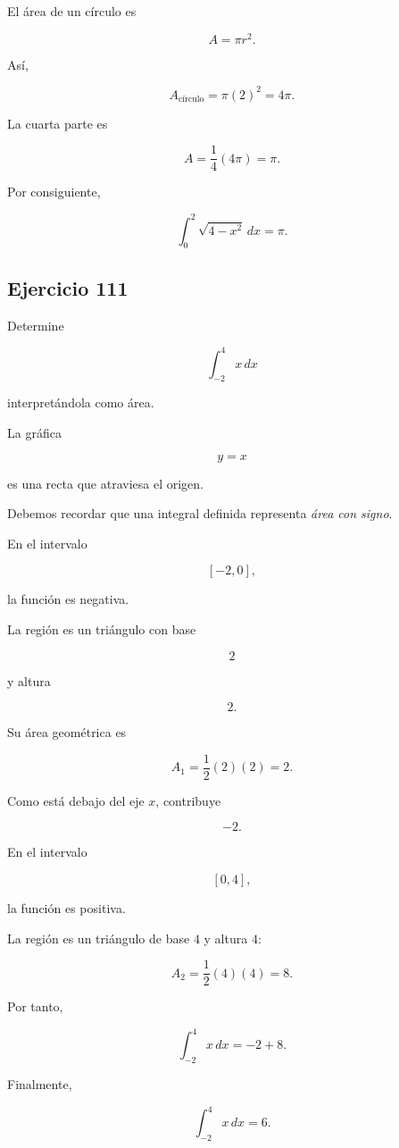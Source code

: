 \documentclass[12pt]{article}
\begin{document}
El área de un círculo es

\[
A=\pi r^2.
\]

Así,

\[
A_{\text{círculo}}
=
\pi(2)^2
=
4\pi.
\]

La cuarta parte es

\[
A=\frac14(4\pi)=\pi.
\]

Por consiguiente,

\[
\boxed{
\int_{0}^{2}\sqrt{4-x^2}\,dx=\pi
}.
\]

\subsection*{Ejercicio 111}

Determine

\[
\int_{-2}^{4}x\,dx
\]

interpretándola como área.

La gráfica

\[
y=x
\]

es una recta que atraviesa el origen.

Debemos recordar que una integral definida representa
\emph{área con signo}.

En el intervalo

\[
[-2,0],
\]

la función es negativa.

La región es un triángulo con base

\[
2
\]

y altura

\[
2.
\]

Su área geométrica es

\[
A_1
=
\frac12(2)(2)
=
2.
\]

Como está debajo del eje \(x\), contribuye

\[
-2.
\]

En el intervalo

\[
[0,4],
\]

la función es positiva.

La región es un triángulo de base \(4\) y altura \(4\):

\[
A_2
=
\frac12(4)(4)
=
8.
\]

Por tanto,

\[
\int_{-2}^{4}x\,dx
=
-2+8.
\]

Finalmente,

\[
\boxed{
\int_{-2}^{4}x\,dx=6
}.
\]
\end{document}
